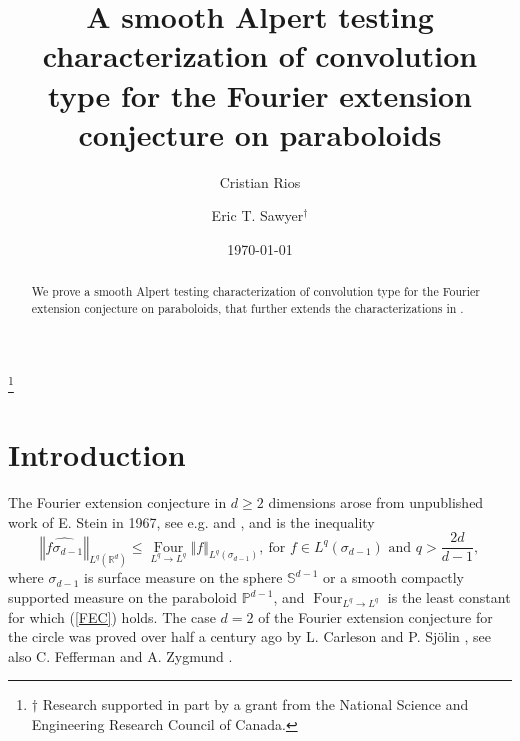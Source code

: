 \documentclass{amsart}%
\theoremstyle{plain}
\numberwithin{equation}{section}
\begin{document}
\title[A smooth Alpert testing characterization of convolution type]{A smooth Alpert testing characterization of convolution type for the Fourier
extension conjecture on paraboloids}
\author{Cristian Rios}
\address{University of Calgary\\
Calgary, Alberta, Canada}
\author[E. T. Sawyer]{Eric T. Sawyer$^{\dagger}$}
\address{Eric T. Sawyer, Department of Mathematics and Statistics\\
McMaster University\\
1280 Main Street West\\
Hamilton, Ontario L8S 4K1 Canada}
\thanks{$\dagger$ Research supported in part by a grant from the National Science and
Engineering Research Council of Canada.}
\date{\today }

\begin{abstract}
We prove a smooth Alpert testing characterization of convolution type for the
Fourier extension conjecture on paraboloids, that further extends the
characterizations in \cite{RiSa3}.

\end{abstract}
\maketitle
\tableofcontents


\section{Introduction}

The Fourier extension conjecture in $d\geq2$ dimensions arose from unpublished
work of E. Stein in 1967, see e.g. \cite[see the Notes at the end of Chapter
IX, p. 432, where Stein proved the extension conjecture for $q>\frac{4d}{d-1}%
$]{Ste2} and \cite{Ste}, and is the inequality%
\begin{equation}
\left\Vert \widehat{f\sigma_{d-1}}\right\Vert _{L^{q}\left(  \mathbb{R}%
^{d}\right)  }\leq\operatorname*{Four}_{L^{q}\rightarrow L^{q}}\left\Vert
f\right\Vert _{L^{q}\left(  \sigma_{d-1}\right)  },\ \text{for }f\in
L^{q}\left(  \sigma_{d-1}\right)  \text{ and }q>\frac{2d}{d-1},\label{FEC}%
\end{equation}
where $\sigma_{d-1}$ is surface measure on the sphere $\mathbb{S}^{d-1}$ or a
smooth compactly supported measure on the paraboloid $\mathbb{P}^{d-1}$, and
$\operatorname*{Four}_{L^{q}\rightarrow L^{q}}$ is the least constant for
which (\ref{FEC}) holds. The case $d=2$ of the Fourier extension conjecture
for the circle was proved over half a century ago by L. Carleson and P.
Sj\"{o}lin \cite{CaSj}, see also C. Fefferman \cite{Fef} and A. Zygmund
\cite{Zyg}.
\end{document}
